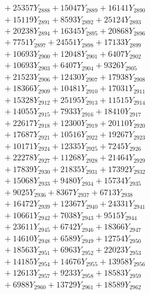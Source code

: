 \documentclass[a4paper,10pt]{article}
\begin{document}
{\begin{align}
&\;  + 25357 Y_{2888} + 15047 Y_{2889} + 16141 Y_{2890} \\[0.3ex]
&\;  + 15119 Y_{2891} + 8593 Y_{2892} + 25124 Y_{2893} \\[0.3ex]
&\;  + 20238 Y_{2894} + 16345 Y_{2895} + 20868 Y_{2896} \\[0.3ex]
&\;  + 7751 Y_{2897} + 24551 Y_{2898} + 17133 Y_{2899} \\[0.3ex]
&\;  + 10693 Y_{2900} + 12048 Y_{2901} + 6407 Y_{2902} \\[0.3ex]
&\;  + 10693 Y_{2903} + 6407 Y_{2904} + 9326 Y_{2905} \\[0.3ex]
&\;  + 21523 Y_{2906} + 12430 Y_{2907} + 17938 Y_{2908} \\[0.5ex]\allowbreak
&\;  + 18366 Y_{2909} + 10481 Y_{2910} + 17031 Y_{2911} \\[0.3ex]
&\;  + 15328 Y_{2912} + 25195 Y_{2913} + 11515 Y_{2914} \\[0.3ex]
&\;  + 14055 Y_{2915} + 7933 Y_{2916} + 18410 Y_{2917} \\[0.3ex]
&\;  + 22617 Y_{2918} + 12300 Y_{2919} + 20110 Y_{2920} \\[0.3ex]
&\;  + 17687 Y_{2921} + 10516 Y_{2922} + 19267 Y_{2923} \\[0.3ex]
&\;  + 10171 Y_{2924} + 12335 Y_{2925} + 7245 Y_{2926} \\[0.3ex]
&\;  + 22278 Y_{2927} + 11268 Y_{2928} + 21464 Y_{2929} \\[0.3ex]
&\;  + 17839 Y_{2930} + 21835 Y_{2931} + 17392 Y_{2932} \\[0.3ex]
&\;  + 15068 Y_{2933} + 9480 Y_{2934} + 15734 Y_{2935} \\[0.3ex]
&\;  + 9025 Y_{2936} + 8367 Y_{2937} + 6713 Y_{2938} \\[0.5ex]\allowbreak
&\;  + 16472 Y_{2939} + 12367 Y_{2940} + 24331 Y_{2941} \\[0.3ex]
&\;  + 10661 Y_{2942} + 7038 Y_{2943} + 9515 Y_{2944} \\[0.3ex]
&\;  + 23611 Y_{2945} + 6742 Y_{2946} + 18366 Y_{2947} \\[0.3ex]
&\;  + 14610 Y_{2948} + 6589 Y_{2949} + 12754 Y_{2950} \\[0.3ex]
&\;  + 18563 Y_{2951} + 6963 Y_{2952} + 22023 Y_{2953} \\[0.3ex]
&\;  + 14185 Y_{2954} + 14676 Y_{2955} + 13958 Y_{2956} \\[0.3ex]
&\;  + 12613 Y_{2957} + 9233 Y_{2958} + 18583 Y_{2959} \\[0.3ex]
&\;  + 6988 Y_{2960} + 13729 Y_{2961} + 18589 Y_{2962} \\[0.3ex]

\end{align}}
\end{document}
